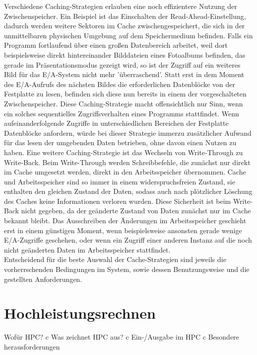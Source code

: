 \documentclass[
	12pt,
	a4paper,
	BCOR10mm,
	DIV14,
	listof=totoc,
	bibliography=totoc,
	headsepline
]{scrreprt}
\begin{document}
Verschiedene Caching-Strategien erlauben eine noch effizientere Nutzung der Zwischenspeicher. Ein Beispiel ist das Einschalten der Read-Ahead-Einstellung, dadurch werden weitere Sektoren im Cache zwischengespeichert, die sich in der unmittelbaren physischen Umgebung auf dem  Speichermedium befinden. Falls ein Programm fortlaufend über einen großen Datenbereich arbeitet, weil dort beispielsweise direkt hintereinander Bilddateien eines Fotoalbums befinden, das gerade im Präsentationsmodus gezeigt wird, so ist der Zugriff auf ein weiteres Bild für das E/A-System nicht mehr 'überraschend'. Statt erst in dem Moment des E/A-Aufrufs des nächsten Bildes die erforderlichen Datenblöcke von der Festplatte zu lesen, befinden sich diese nun bereits in einem der vorgeschalteten Zwischenspeicher. Diese Caching-Strategie macht offensichtlich nur Sinn, wenn ein solches sequentielles Zugriffsverhalten eines Programms stattfindet. Wenn aufeinanderfolgende Zugriffe in unterschiedlichen Bereichen der Festplatte Datenblöcke anfordern, würde bei dieser Strategie immerzu zusätzlicher Aufwand für das lesen der umgebenden Daten betrieben, ohne davon einen Nutzen zu haben. 
Eine weitere Caching-Strategie ist das Wechseln von Write-Through zu Write-Back. Beim Write-Through werden Schreibbefehle, die zunächst nur direkt im Cache umgesetzt werden, direkt in den Arbeitsspeicher übernommen. Cache und Arbeitsspeicher sind so immer in einem widerspruchsfreien Zustand, sie enthalten den gleichen Zustand der Daten, sodass auch nach plötzlicher Löschung des Caches keine Informationen verloren wurden. Diese Sicherheit ist beim Write-Back nicht gegeben, da der geänderte Zustand von Daten zunächst nur im Cache bekannt bleibt. Das Ausschreiben der Änderungen im Arbeitsspeicher geschieht erst in einem günstigen Moment, wenn beispielsweise ansonsten gerade wenige E/A-Zugriffe geschehen, oder wenn ein Zugriff einer anderen Instanz auf die noch nicht geänderten Daten im Arbeitsspeicher stattfindet.\\
Entscheidend für die beste Auswahl der Cache-Strategien sind jeweils die vorherrschenden Bedingungen im System, sowie dessen Benutzungsweise und die gestellten Anforderungen.

\section{Hochleistungsrechnen}
Wofür HPC? c
Was zeichnet HPC aus? c
Ein-/Ausgabe im HPC  c
Besondere herausforderungen
\medskip
\end{document}
